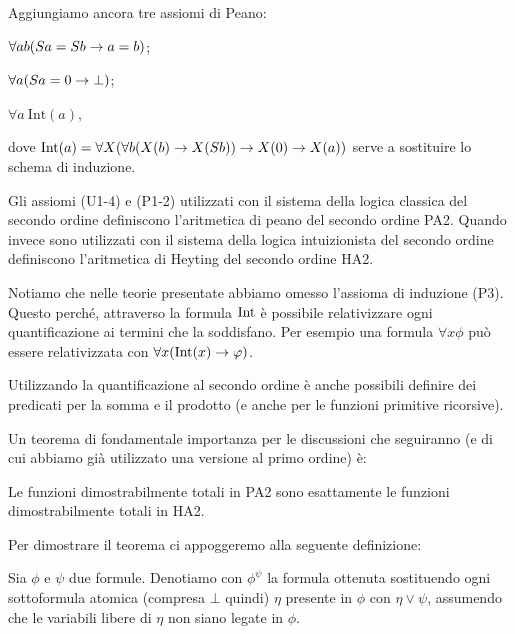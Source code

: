 \documentclass[]{marticle}
\begin{document}
Aggiungiamo ancora tre assiomi di Peano:
\begin{nlist}[P1]
    \item $\forall ab(Sa =Sb \rightarrow a = b)$;
    \item $\forall a(Sa=0 \rightarrow \bot)$;
    \item $\forall a\ \text{Int}(a)$,
\end{nlist}
dove $\text{Int}(a) = \forall X(\forall b (X(b)\rightarrow X(Sb)) \rightarrow X(0) \rightarrow X(a))$
serve a sostituire lo schema di induzione.

\begin{block}[Definizione]
    Gli assiomi (U1-4) e (P1-2) utilizzati con il sistema della logica classica
    del secondo ordine definiscono l'aritmetica di peano del secondo ordine PA2.
    Quando invece sono utilizzati con il sistema della logica intuizionista del
    secondo ordine definiscono l'aritmetica di Heyting del secondo ordine HA2.
\end{block}

Notiamo che nelle teorie presentate abbiamo omesso l'assioma di induzione (P3).
Questo perch\'e, attraverso la formula $\text{Int}$ \`e possibile relativizzare ogni
quantificazione ai termini che la soddisfano. Per esempio una formula $\forall x
\phi$ pu\`o essere relativizzata con $\forall x (\text{Int}(x)\rightarrow \varphi)$.

Utilizzando la quantificazione al secondo ordine \`e anche possibili definire
dei predicati per la somma e il prodotto (e anche per le funzioni primitive
ricorsive).

Un teorema di fondamentale importanza per le discussioni che seguiranno (e di
cui abbiamo gi\`a utilizzato una versione al primo ordine) \`e:
\begin{block}[Teorema]
    Le funzioni dimostrabilmente totali in PA2 sono esattamente le funzioni
    dimostrabilmente totali in HA2.
\end{block}

Per dimostrare il teorema ci appoggeremo alla seguente definizione:
\begin{block}[Definizione]
    Sia $\phi$ e $\psi$ due formule. Denotiamo con $\phi^\psi$ la formula
    ottenuta sostituendo ogni sottoformula atomica (compresa $\bot$ quindi)
    $\eta$ presente in $\phi$ con $\eta\lor\psi$, assumendo che le variabili
    libere di $\eta$ non siano legate in $\phi$.
\end{block}
\end{document}
